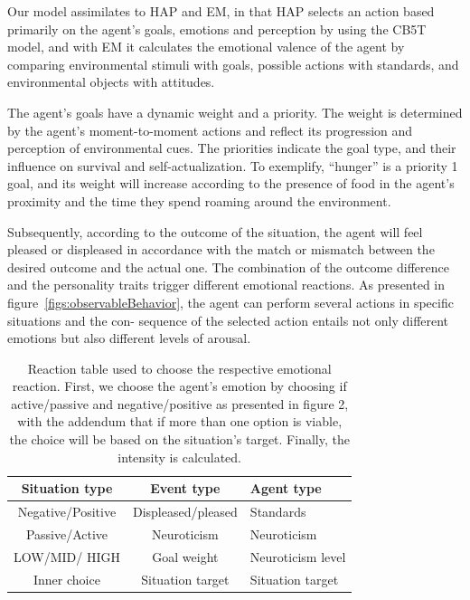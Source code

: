 Our model assimilates to HAP and EM, in that HAP selects an action based primarily on the agent’s goals, emotions and perception by using the CB5T model, and with EM it calculates the emotional valence of the agent by comparing environmental stimuli with goals, possible actions with standards, and environmental objects with attitudes.

The agent’s goals have a dynamic weight and a priority. The weight is determined by the agent’s moment-to-moment actions and reflect its progression and perception of environmental cues. The priorities indicate the goal type, and their influence on survival and self-actualization. To exemplify, “hunger” is a priority 1 goal, and its weight will increase according to the presence of food in the agent’s proximity and the time they spend roaming around the environment.

Subsequently, according to the outcome of the situation, the agent will feel pleased or displeased in accordance with the match or mismatch between the desired outcome and the actual one. The combination of the outcome difference and the personality traits trigger different emotional reactions. As presented in figure~\ref{figs:observableBehavior}, the agent can perform several actions in specific situations and the con- sequence of the selected action entails not only different emotions but also different levels of arousal.

\begin{table}[ht]
\caption{Reaction table used to choose the respective emotional reaction. First, we choose the agent’s emotion by choosing if active/passive and negative/positive  as presented in figure 2, with the addendum that if more than one option is viable, the choice will be based on the situation’s target. Finally, the intensity is calculated.} \label{p4tab:reactionTab}
\centering
\begin{tabularx}{0.9\textwidth}{|c|c|Y|}
\hline
Situation type& Event type&	Agent type \\ \hline
Negative/Positive & Displeased/pleased & Standards \\ \hline
Passive/Active & Neuroticism & Neuroticism \\ \hline
LOW/MID/ HIGH & Goal weight & Neuroticism level \\ \hline
Inner choice & Situation target & Situation target \\ \hline
\end{tabularx}
\end{table}

